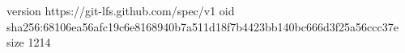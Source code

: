 version https://git-lfs.github.com/spec/v1
oid sha256:68106ea56afc19c6e8168940b7a511d18f7b4423bb140bc666d3f25a56ccc37e
size 1214
